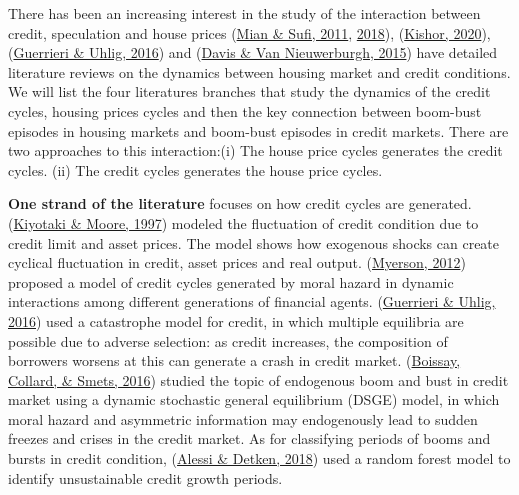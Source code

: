 \documentclass[
  12pt,
]{article}
\begin{document}
There has been an increasing interest in the study of the interaction between credit, speculation and house prices (\protect\hyperlink{ref-mian_house_2011}{Mian \& Sufi, 2011}, \protect\hyperlink{ref-mian_credit_2018}{2018}), (\protect\hyperlink{ref-kishor_forecasting_2020}{Kishor, 2020}), (\protect\hyperlink{ref-guerrieri_housing_2016}{Guerrieri \& Uhlig, 2016}) and (\protect\hyperlink{ref-davis_housing_2015}{Davis \& Van Nieuwerburgh, 2015}) have detailed literature reviews on the dynamics between housing market and credit conditions. We will list the four literatures branches that study the dynamics of the credit cycles, housing prices cycles and then the key connection between boom-bust episodes in housing markets and boom-bust episodes in credit markets. There are two approaches to this interaction:(i) The house price cycles generates the credit cycles. (ii) The credit cycles generates the house price cycles.

\textbf{One strand of the literature} focuses on how credit cycles are generated. (\protect\hyperlink{ref-kiyotaki_credit_1997}{Kiyotaki \& Moore, 1997}) modeled the fluctuation of credit condition due to credit limit and asset prices. The model shows how exogenous shocks can create cyclical fluctuation in credit, asset prices and real output. (\protect\hyperlink{ref-myerson_model_2012}{Myerson, 2012}) proposed a model of credit cycles generated by moral hazard in dynamic interactions among different generations of financial agents. (\protect\hyperlink{ref-guerrieri_housing_2016}{Guerrieri \& Uhlig, 2016}) used a catastrophe model for credit, in which multiple equilibria are possible due to adverse selection: as credit increases, the composition of borrowers worsens at this can generate a crash in credit market. (\protect\hyperlink{ref-boissay_booms_2016}{Boissay, Collard, \& Smets, 2016}) studied the topic of endogenous boom and bust in credit market using a dynamic stochastic general equilibrium (DSGE) model, in which moral hazard and asymmetric information may endogenously lead to sudden freezes and crises in the credit market. As for classifying periods of booms and bursts in credit condition, (\protect\hyperlink{ref-alessi_identifying_2018}{Alessi \& Detken, 2018}) used a random forest model to identify unsustainable credit growth periods.
\end{document}
